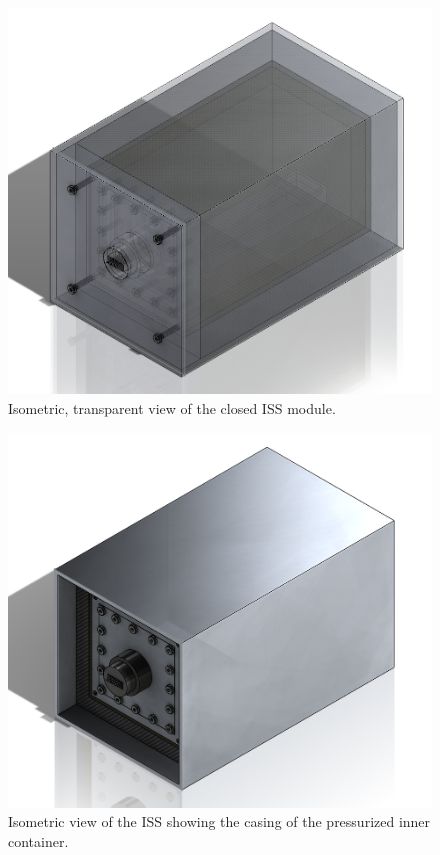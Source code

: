 \begin{centering}
\begin{figure}[h]
    \includegraphics[width=\textwidth]{Figures/iss-closed-transparent.png}
    \caption{Isometric, transparent view of the closed ISS module.}
    \label{fig:iss-closed-transparent-image}
  \end{figure}
  \begin{figure}[h]
    \includegraphics[width=\textwidth]{Figures/iss.png}
    \caption{Isometric view of the ISS showing the casing of the pressurized inner container.}

\end{figure}
\end{centering}
